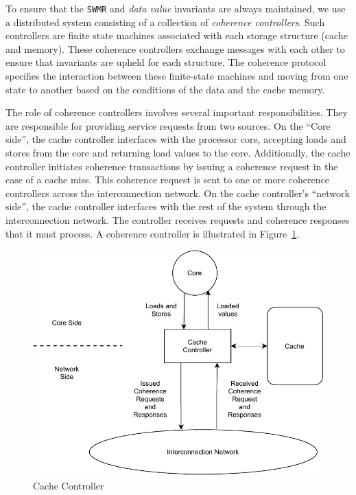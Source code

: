 To ensure that the \texttt{SWMR} and \emph{data value} invariants are always maintained, we use a distributed system consisting of a collection of \emph{coherence controllers}. Such controllers are finite state machines associated with each storage structure (cache and memory). These coherence controllers exchange messages with each other to ensure that invariants are upheld for each structure. The coherence protocol specifies the interaction between these finite-state machines and moving from one state to another based on the conditions of the data and the cache memory.


The role of coherence controllers involves several important responsibilities. They are responsible for providing service requests from two sources. On the ``Core side'', the cache controller interfaces with the processor core, accepting loads and stores from the core and returning load values to the core. Additionally, the cache controller initiates coherence transactions by issuing a coherence request in the case of a cache miss. This coherence request is sent to one or more coherence controllers across the interconnection network. On the cache controller's ``network side'', the cache controller interfaces with the rest of the system through the interconnection network. The controller receives requests and coherence responses that it must process. A coherence controller is illustrated in Figure~\ref{fig:cache_controller}.

\begin{figure}[ht]
  \centering
  \includegraphics[scale=0.9]{contents/figures/III_3_Cache_Controller.pdf}
  \caption{\label{fig:cache_controller}Cache Controller}
\end{figure}


